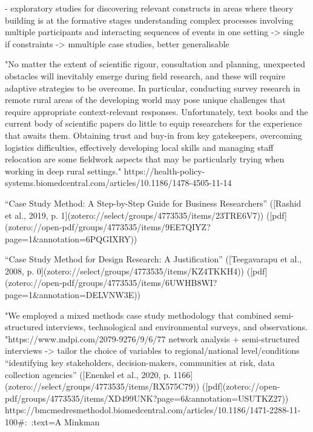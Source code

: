 - exploratory studies for discovering relevant constructs in areas where theory building is at the formative stages
understanding complex processes involving multiple participants and interacting sequences of events in one setting
-> single if constraints -> mmultiple case studies, better generalisable


"No matter the extent of scientific rigour, consultation and planning, unexpected obstacles will inevitably emerge during field research, and these will require adaptive strategies to be overcome. In particular, conducting survey research in remote rural areas of the developing world may pose unique challenges that require appropriate context-relevant responses. Unfortunately, text books and the current body of scientific papers do little to equip researchers for the experience that awaits them. Obtaining trust and buy-in from key gatekeepers, overcoming logistics difficulties, effectively developing local skills and managing staff relocation are some fieldwork aspects that may be particularly trying when working in deep rural settings."
https://health-policy-systems.biomedcentral.com/articles/10.1186/1478-4505-11-14

“Case Study Method: A Step-by-Step Guide for Business Researchers” ([Rashid et al., 2019, p. 1](zotero://select/groups/4773535/items/23TRE6V7)) ([pdf](zotero://open-pdf/groups/4773535/items/9EE7QIYZ?page=1&annotation=6PQGIXRY))

“Case Study Method for Design Research: A Justification” ([Teegavarapu et al., 2008, p. 0](zotero://select/groups/4773535/items/KZ4TKKH4)) ([pdf](zotero://open-pdf/groups/4773535/items/6UWHB8WI?page=1&annotation=DELVNW3E))

"We employed a mixed methods case study methodology that combined semi-structured interviews, technological and environmental surveys, and observations. "https://www.mdpi.com/2079-9276/9/6/77
network analysis + semi-structured interviews -> tailor the choice of variables to regional/national level/conditions “identifying key stakeholders, decision-makers, communities at risk, data collection agencies” ([Enenkel et al., 2020, p. 1166](zotero://select/groups/4773535/items/RX575C79)) ([pdf](zotero://open-pdf/groups/4773535/items/XD499UNK?page=6&annotation=USUTKZ27))
https://bmcmedresmethodol.biomedcentral.com/articles/10.1186/1471-2288-11-100#:~:text=A%
Minkman




